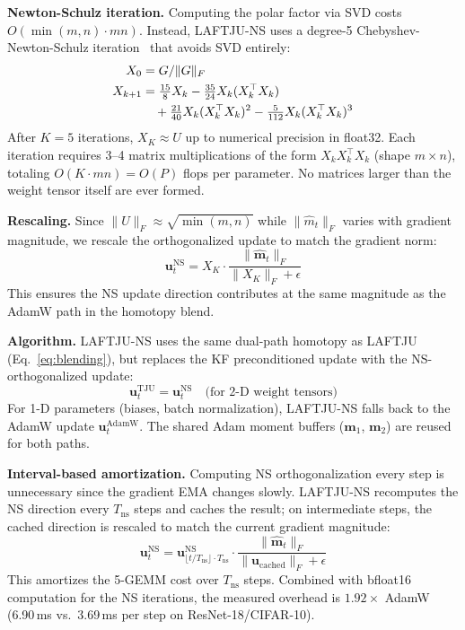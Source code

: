 \documentclass[10pt,twocolumn]{article}
\newcommand{\method}{LAFTJU}
\begin{document}
\textbf{Newton-Schulz iteration.} Computing the polar factor via SVD costs $O(\min(m,n) \cdot mn)$. Instead, \method{}-NS uses a degree-5 Chebyshev-Newton-Schulz iteration~\cite{kosson,muon} that avoids SVD entirely:
\begin{align}
X_0 &= G / \|G\|_F \notag \\
X_{k+1} &= \tfrac{15}{8} X_k - \tfrac{35}{24} X_k (X_k^\top X_k) \notag \\
&\quad + \tfrac{21}{40} X_k (X_k^\top X_k)^2 - \tfrac{5}{112} X_k (X_k^\top X_k)^3
\label{eq:ns}
\end{align}
After $K=5$ iterations, $X_K \approx U$ up to numerical precision in float32. Each iteration requires 3--4 matrix multiplications of the form $X_k X_k^\top X_k$ (shape $m \times n$), totaling $O(K \cdot mn) = O(P)$ flops per parameter. No matrices larger than the weight tensor itself are ever formed.

\textbf{Rescaling.} Since $\|U\|_F \approx \sqrt{\min(m,n)}$ while $\|\hat{m}_t\|_F$ varies with gradient magnitude, we rescale the orthogonalized update to match the gradient norm:
\begin{equation}
\mathbf{u}_t^{\text{NS}} = X_K \cdot \frac{\|\hat{\mathbf{m}}_t\|_F}{\|X_K\|_F + \epsilon}
\label{eq:ns_rescale}
\end{equation}
This ensures the NS update direction contributes at the same magnitude as the AdamW path in the homotopy blend.

\textbf{Algorithm.} \method{}-NS uses the same dual-path homotopy as \method{} (Eq.~\eqref{eq:blending}), but replaces the KF preconditioned update with the NS-orthogonalized update:
\begin{equation}
\mathbf{u}_t^{\text{TJU}} = \mathbf{u}_t^{\text{NS}} \quad \text{(for 2-D weight tensors)}
\end{equation}
For 1-D parameters (biases, batch normalization), \method{}-NS falls back to the AdamW update $\mathbf{u}_t^{\text{AdamW}}$. The shared Adam moment buffers ($\mathbf{m}_1$, $\mathbf{m}_2$) are reused for both paths.

\textbf{Interval-based amortization.} Computing NS orthogonalization every step is unnecessary since the gradient EMA changes slowly. \method{}-NS recomputes the NS direction every $T_{\text{ns}}$ steps and caches the result; on intermediate steps, the cached direction is rescaled to match the current gradient magnitude:
\begin{equation}
\mathbf{u}_t^{\text{NS}} = \mathbf{u}_{\lfloor t/T_{\text{ns}} \rfloor \cdot T_{\text{ns}}}^{\text{NS}} \cdot \frac{\|\hat{\mathbf{m}}_t\|_F}{\|\mathbf{u}_{\text{cached}}\|_F + \epsilon}
\end{equation}
This amortizes the 5-GEMM cost over $T_{\text{ns}}$ steps. Combined with bfloat16 computation for the NS iterations, the measured overhead is $1.92\times$ AdamW (6.90\,ms vs.\ 3.69\,ms per step on ResNet-18/CIFAR-10).
\end{document}
